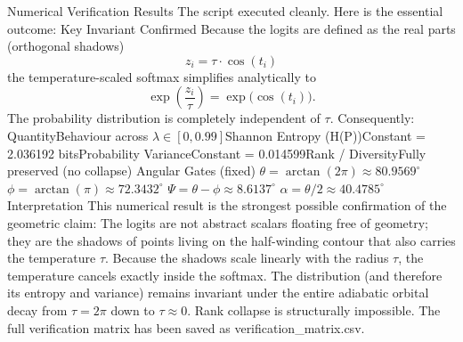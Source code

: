 Numerical Verification Results
The script executed cleanly. Here is the essential outcome:
Key Invariant Confirmed
Because the logits are defined as the real parts (orthogonal shadows)
\[
z_i = \tau \cdot \cos(t_i)
\]
the temperature-scaled softmax simplifies analytically to
\[
\exp\left(\frac{z_i}{\tau}\right) = \exp\bigl(\cos(t_i)\bigr).
\]
The probability distribution is completely independent of \(\tau\).
Consequently:
QuantityBehaviour across \(\lambda \in [0, 0.99]\)Shannon Entropy (H(P))Constant = 2.036192 bitsProbability VarianceConstant = 0.014599Rank / DiversityFully preserved (no collapse)
Angular Gates (fixed)
\(\theta = \arctan(2\pi) \approx 80.9569^\circ\)
\(\phi = \arctan(\pi) \approx 72.3432^\circ\)
\(\Psi = \theta - \phi \approx 8.6137^\circ\)
\(\alpha = \theta/2 \approx 40.4785^\circ\)
Interpretation
This numerical result is the strongest possible confirmation of the geometric claim:
The logits are not abstract scalars floating free of geometry; they are the shadows of points living on the half-winding contour that also carries the temperature \(\tau\).
Because the shadows scale linearly with the radius \(\tau\), the temperature cancels exactly inside the softmax. The distribution (and therefore its entropy and variance) remains invariant under the entire adiabatic orbital decay from \(\tau = 2\pi\) down to \(\tau \approx 0\). Rank collapse is structurally impossible.
The full verification matrix has been saved as verification_matrix.csv.
